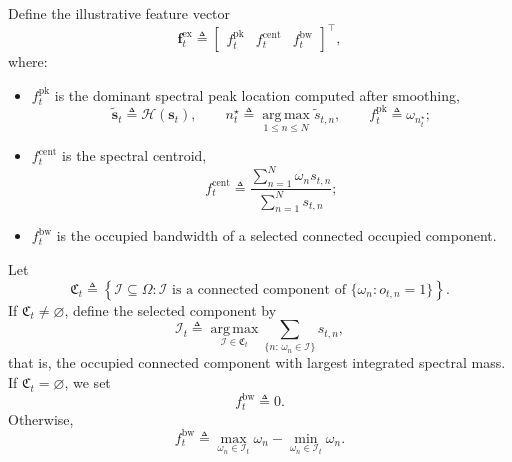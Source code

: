 \documentclass[11pt]{article}
\begin{document}
Define the illustrative feature vector
\begin{equation}
\mathbf{f}_{t}^{\mathrm{ex}}
\triangleq
\begin{bmatrix}
f_{t}^{\mathrm{pk}} &
f_{t}^{\mathrm{cent}} &
f_{t}^{\mathrm{bw}}
\end{bmatrix}^{\top},
\end{equation}
where:
\begin{itemize}
    \item $f_{t}^{\mathrm{pk}}$ is the dominant spectral peak location computed after smoothing,
    \begin{equation}
    \tilde{\mathbf{s}}_t \triangleq \mathcal{H}(\mathbf{s}_t),
    \qquad
    n_t^{\star} \triangleq \operatorname*{arg\,max}_{1\le n \le N}\tilde{s}_{t,n},
    \qquad
    f_{t}^{\mathrm{pk}} \triangleq \omega_{n_t^{\star}};
    \end{equation}

    \item $f_{t}^{\mathrm{cent}}$ is the spectral centroid,
    \begin{equation}
    f_{t}^{\mathrm{cent}}
    \triangleq
    \frac{\sum_{n=1}^{N}\omega_n s_{t,n}}
         {\sum_{n=1}^{N}s_{t,n}};
    \end{equation}

    \item $f_{t}^{\mathrm{bw}}$ is the occupied bandwidth of a selected connected occupied component.
\end{itemize}

Let
\begin{equation}
\mathfrak{C}_t
\triangleq
\left\{
\mathcal{I} \subseteq \Omega :
\mathcal{I} \text{ is a connected component of }
\{\omega_n : o_{t,n}=1\}
\right\}.
\end{equation}
If $\mathfrak{C}_t \neq \varnothing$, define the selected component by
\begin{equation}
\mathcal{I}_t
\triangleq
\operatorname*{arg\,max}_{\mathcal{I}\in\mathfrak{C}_t}
\sum_{\{n:\,\omega_n\in\mathcal{I}\}} s_{t,n},
\end{equation}
that is, the occupied connected component with largest integrated spectral mass. If
$\mathfrak{C}_t=\varnothing$, we set
\begin{equation}
f_{t}^{\mathrm{bw}} \triangleq 0.
\end{equation}
Otherwise,
\begin{equation}
f_{t}^{\mathrm{bw}}
\triangleq
\max_{\omega_n \in \mathcal{I}_t}\omega_n
-
\min_{\omega_n \in \mathcal{I}_t}\omega_n.
\end{equation}
\end{document}
